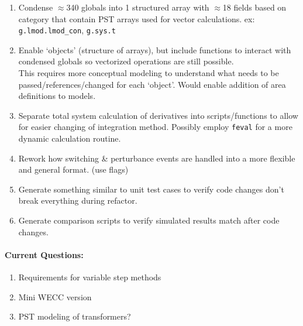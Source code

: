\documentclass[12pt]{article}
\begin{document}
\begin{multicols}{2}
\begin{enumerate}
		\itemsep 0em 
		\item Condense $\approx$340 globals into 1 structured array with $\approx$18 fields based on category that contain PST arrays used for vector calculations. ex: \verb|g.lmod.lmod_con|, \verb|g.sys.t|
		\item Enable `objects' (structure of arrays), but include functions to interact with condensed globals so vectorized operations are still possible.\\
		This requires more conceptual modeling to understand what needs to be passed/references/changed for each `object'.
		Would enable addition of area definitions to models.
		\item Separate total system calculation of derivatives into scripts/functions to allow for easier changing of integration method.
		Possibly employ \verb|feval| for a more dynamic calculation routine.
		\item Rework how switching \& perturbance events are handled into a more flexible and general format. (use flags)
		\item Generate something similar to unit test cases to verify code changes don't break everything during refactor.
		\item Generate comparison scripts to verify simulated results match after code changes.
	\end{enumerate}
	


\paragraph{Current Questions:}
	\begin{enumerate}
	\itemsep0em 
	\item Requirements for variable step methods
	\item Mini WECC version
	\item PST modeling of transformers?
	\end{enumerate}



\vfill\null
\end{multicols}
\end{document}
